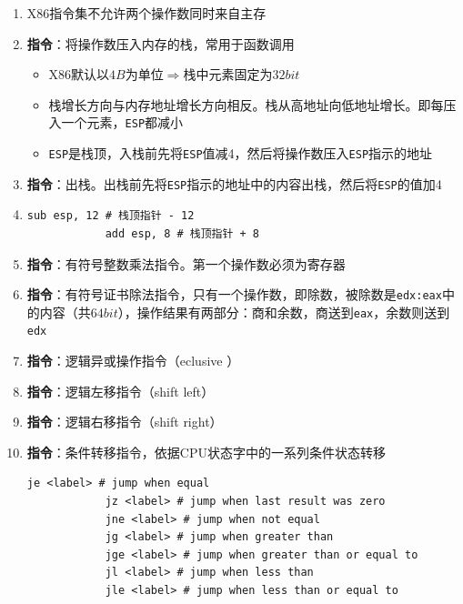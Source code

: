 \documentclass[a4paper,12pt]{article}
\begin{document}
    \begin{enumerate}
        \item X86指令集不允许两个操作数同时来自主存
        \item \textbf{指令}：将操作数压入内存的栈，常用于函数调用
        \begin{itemize}
            \item X86默认以$4B$为单位$\Rightarrow$栈中元素固定为$32bit$
            \item 栈增长方向与内存地址增长方向相反。栈从高地址向低地址增长。即每压入一个元素，\texttt{ESP}都减小
            \item \texttt{ESP}是栈顶，入栈前先将\texttt{ESP}值减4，然后将操作数压入\texttt{ESP}指示的地址
        \end{itemize}
        \item \textbf{指令}：出栈。出栈前先将\texttt{ESP}指示的地址中的内容出栈，然后将\texttt{ESP}的值加4
        \item \leavevmode
        \begin{lstlisting}[language={[x86masm]Assembler}]
            sub esp, 12 # 栈顶指针 - 12
            add esp, 8 # 栈顶指针 + 8
        \end{lstlisting}
        \item \textbf{指令}：有符号整数乘法指令。第一个操作数必须为寄存器
        \item \textbf{指令}：有符号证书除法指令，只有一个操作数，即除数，被除数是\texttt{edx:eax}中的内容（共$64bit$），操作结果有两部分：商和余数，商送到\texttt{eax}，余数则送到\texttt{edx}
        \item \textbf{指令}：逻辑异或操作指令（e{\color{red}{x}}clusive {\color{red}{or}}）
        \item \textbf{指令}：逻辑左移指令（shift left）
        \item \textbf{指令}：逻辑右移指令（shift right）
        \item \textbf{指令}：条件转移指令，依据CPU状态字中的一系列条件状态转移
        \begin{lstlisting}[language={[x86masm]Assembler}]
            je <label> # jump when equal
            jz <label> # jump when last result was zero
            jne <label> # jump when not equal
            jg <label> # jump when greater than
            jge <label> # jump when greater than or equal to
            jl <label> # jump when less than
            jle <label> # jump when less than or equal to
        \end{lstlisting}

\end{enumerate}
\end{document}

